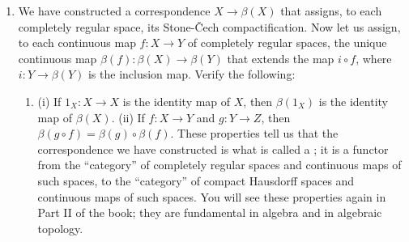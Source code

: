 \begin{enumerate}[itemsep=0.4em, parsep=0pt, topsep=0pt, partopsep=0pt, leftmargin=*, label=\arabic*., ref=\arabic*]
\begin{enumerate}[itemsep=0.2em, parsep=0pt, topsep=0pt, partopsep=0pt, leftmargin=*, label=(\alph*), align=left]
 \item Show that if \(X\) is completely regular and noncompact, then \(\beta (X)\) is not metrizable.
 \end{enumerate}
\item We have constructed a correspondence \(X \rightarrow \beta (X)\) that assigns, to each completely regular space, its Stone-Čech compactification. Now let us assign, to each continuous map \(f : X \rightarrow Y\) of completely regular spaces, the unique continuous map \(\beta ( f) : \beta (X) \rightarrow \beta (Y)\) that extends the map \(i \circ f\), where \(i : Y \rightarrow \beta (Y)\) is the inclusion map. Verify the following:
 \begin{enumerate}[itemsep=0.2em, parsep=0pt, topsep=0pt, partopsep=0pt, leftmargin=*, label=(\alph*), align=left]
 \item (i) If \(1_{X} : X \rightarrow X\) is the identity map of \(X\), then \(\beta ( 1_{X})\) is the identity map of \(\beta (X)\). (ii) If \(f : X \rightarrow Y\) and \(g : Y \rightarrow Z\), then \(\beta ( {g \circ f}) = \beta ( g) \circ \beta ( f)\). These properties tell us that the correspondence we have constructed is what is called a ; it is a functor from the ``category'' of completely regular spaces and continuous maps of such spaces, to the ``category'' of compact Hausdorff spaces and continuous maps of such spaces. You will see these properties again in Part II of the book; they are fundamental in algebra and in algebraic topology.
 \end{enumerate}
\end{enumerate}